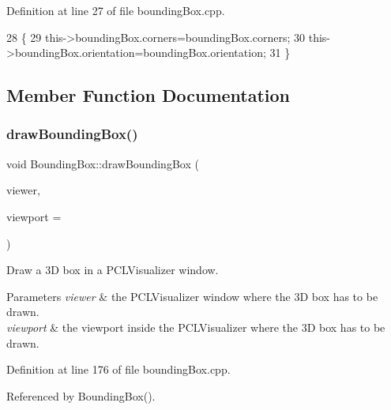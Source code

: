 Definition at line 27 of file bounding\+Box.\+cpp.


\begin{DoxyCode}
28 \{
29     this->boundingBox.corners=boundingBox.corners;
30     this->boundingBox.orientation=boundingBox.orientation;
31 \}
\end{DoxyCode}


\subsection{Member Function Documentation}
\label{classiCub_1_1data3D_1_1BoundingBox_a45bbf770b8c816f6c7d47ba747beaaaf} 
\subsubsection{\texorpdfstring{draw\+Bounding\+Box()}{drawBoundingBox()}}
{\footnotesize\ttfamily void Bounding\+Box\+::draw\+Bounding\+Box (\begin{DoxyParamCaption}\item[{boost\+::shared\+\_\+ptr$<$ pcl\+::visualization\+::\+P\+C\+L\+Visualizer $>$}]{viewer,  }\item[{int}]{viewport = {} }\end{DoxyParamCaption})}



Draw a 3D box in a P\+C\+L\+Visualizer window. 


\begin{DoxyParams}{Parameters}
{\em viewer} & the P\+C\+L\+Visualizer window where the 3D box has to be drawn. \\
\hline
{\em viewport} & the viewport inside the P\+C\+L\+Visualizer where the 3D box has to be drawn. \\
\hline
\end{DoxyParams}


Definition at line 176 of file bounding\+Box.\+cpp.



Referenced by Bounding\+Box().


